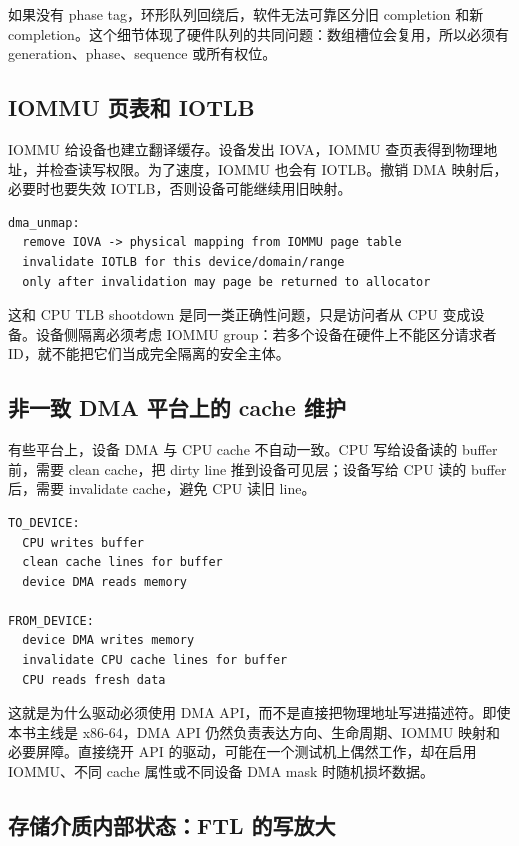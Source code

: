 如果没有 phase tag，环形队列回绕后，软件无法可靠区分旧 completion 和新 completion。这个细节体现了硬件队列的共同问题：数组槽位会复用，所以必须有 generation、phase、sequence 或所有权位。

\subsection{IOMMU 页表和 IOTLB}

IOMMU 给设备也建立翻译缓存。设备发出 IOVA，IOMMU 查页表得到物理地址，并检查读写权限。为了速度，IOMMU 也会有 IOTLB。撤销 DMA 映射后，必要时也要失效 IOTLB，否则设备可能继续用旧映射。

\begin{lstlisting}
dma_unmap:
  remove IOVA -> physical mapping from IOMMU page table
  invalidate IOTLB for this device/domain/range
  only after invalidation may page be returned to allocator
\end{lstlisting}

这和 CPU TLB shootdown 是同一类正确性问题，只是访问者从 CPU 变成设备。设备侧隔离必须考虑 IOMMU group：若多个设备在硬件上不能区分请求者 ID，就不能把它们当成完全隔离的安全主体。

\subsection{非一致 DMA 平台上的 cache 维护}

有些平台上，设备 DMA 与 CPU cache 不自动一致。CPU 写给设备读的 buffer 前，需要 clean cache，把 dirty line 推到设备可见层；设备写给 CPU 读的 buffer 后，需要 invalidate cache，避免 CPU 读旧 line。

\begin{lstlisting}
TO_DEVICE:
  CPU writes buffer
  clean cache lines for buffer
  device DMA reads memory

FROM_DEVICE:
  device DMA writes memory
  invalidate CPU cache lines for buffer
  CPU reads fresh data
\end{lstlisting}

这就是为什么驱动必须使用 DMA API，而不是直接把物理地址写进描述符。即使本书主线是 x86-64，DMA API 仍然负责表达方向、生命周期、IOMMU 映射和必要屏障。直接绕开 API 的驱动，可能在一个测试机上偶然工作，却在启用 IOMMU、不同 cache 属性或不同设备 DMA mask 时随机损坏数据。

\subsection{存储介质内部状态：FTL 的写放大}

